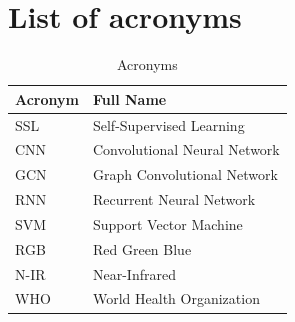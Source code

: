 \documentclass[a4paper,openany]{scrbook}
\begin{document}
\chapter*{List of acronyms}

\begin{table}[htbp]
\centering
\caption{Acronyms}
\begin{tabular}{ll}
\toprule
Acronym & Full Name \\
\midrule
    SSL & Self-Supervised Learning \\
    CNN & Convolutional Neural Network \\
    GCN & Graph Convolutional Network \\
    RNN & Recurrent Neural Network \\
    SVM & Support Vector Machine \\
    RGB & Red Green Blue \\
    N-IR & Near-Infrared \\
    WHO & World Health Organization \\
\bottomrule
\end{tabular}
\end{table}


\cleardoublepage%
\setcounter{page}{1}






%



\end{document}
